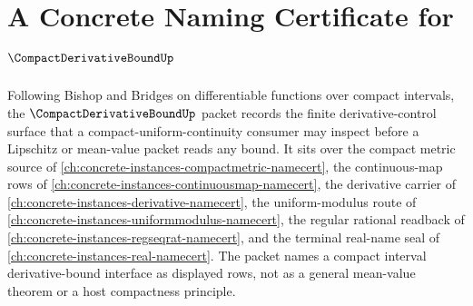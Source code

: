 \chapter{A Concrete Naming Certificate for $\CompactDerivativeBoundUp$}
\label{ch:concrete-instances-compact-derivative-bound-namecert}

Following Bishop and Bridges on differentiable functions over compact intervals, the $\CompactDerivativeBoundUp$ packet records the finite derivative-control surface that a compact-uniform-continuity consumer may inspect before a Lipschitz or mean-value packet reads any bound. It sits over the compact metric source of \autoref{ch:concrete-instances-compactmetric-namecert}, the continuous-map rows of \autoref{ch:concrete-instances-continuousmap-namecert}, the derivative carrier of \autoref{ch:concrete-instances-derivative-namecert}, the uniform-modulus route of \autoref{ch:concrete-instances-uniformmodulus-namecert}, the regular rational readback of \autoref{ch:concrete-instances-regseqrat-namecert}, and the terminal real-name seal of \autoref{ch:concrete-instances-real-namecert}. The packet names a compact interval derivative-bound interface as displayed rows, not as a general mean-value theorem or a host compactness principle.

